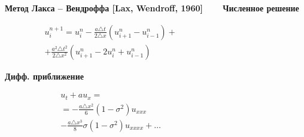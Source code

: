 \documentclass[10pt,xcolor=pst,aspectratio=169]{beamer}
\begin{document}
\begin{frame}{}

    \transdissolve[duration=0.1]
    \justifying
    \large



    \begin{columns}
        \begin{column}[T]{0.5\textwidth}
            \begin{center}
                \textbf{Метод Лакса -- Вендроффа [Lax, Wendroff, 1960]}
            \end{center}
            \[
                \begin{split}
                    &u^{n + 1}_{i} = u^{n}_{i} - \frac{a \triangle t}{2 \triangle x} (u^{n}_{i + 1} - u^{n}_{i - 1}) + \\
                    & + \frac{a^{2} \triangle t^{2}}{2 \triangle x^{2}} (u^{n}_{i + 1} - 2 u^{n}_{i} + u^{n}_{i - 1})
                \end{split}
            \]
            \begin{center}
                \textbf{Дифф. приближение}
            \end{center}
            \[
                \begin{split}
                    &u_{t} + a u_{x} =\\
                    &= - \frac{a \triangle x^{2}}{6} \left( 1 - \sigma^{2} \right) \boxed{u_{xxx}}\\
                    &- \frac{a \triangle x^{3}}{8} \sigma (1 - \sigma^{2}) \boxed{u_{xxxx}} + \ldots
                \end{split}
            \]
        \end{column}
        \begin{column}[T]{0.5\textwidth}
            \begin{center}
                \textbf{Численное решение}
            \end{center}
            \begin{center}
                 \begin{center}
                \end{center}
            \end{center}
        \end{column}
    \end{columns}

\end{frame}
\end{document}
